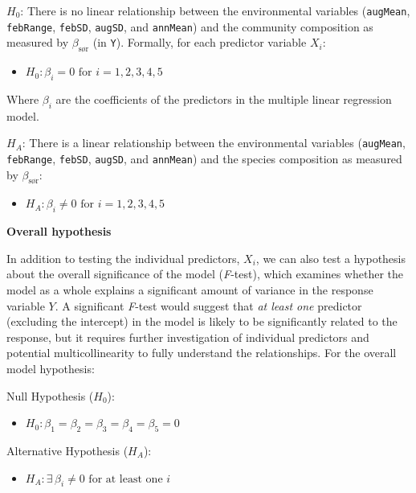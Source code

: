 \documentclass[
  letterpaper,
]{book}
\providecommand{\tightlist}{%
  \setlength{\itemsep}{0pt}\setlength{\parskip}{0pt}}\usepackage{longtable,booktabs,array}
\begin{document}
\(H_0\): There is no linear relationship between the environmental
variables (\texttt{augMean}, \texttt{febRange}, \texttt{febSD},
\texttt{augSD}, and \texttt{annMean}) and the community composition as
measured by \(\beta_\text{sør}\) (in \texttt{Y}). Formally, for each
predictor variable \(X_i\):

\begin{itemize}
\tightlist
\item
  \(H_0: \beta_i = 0 \text{ for } i = 1, 2, 3, 4, 5\)
\end{itemize}

Where \(\beta_i\) are the coefficients of the predictors in the multiple
linear regression model.

\(H_A\): There is a linear relationship between the environmental
variables (\texttt{augMean}, \texttt{febRange}, \texttt{febSD},
\texttt{augSD}, and \texttt{annMean}) and the species composition as
measured by \(\beta_\text{sør}\):

\begin{itemize}
\tightlist
\item
  \(H_A: \beta_i \neq 0 \text{ for } i = 1, 2, 3, 4, 5\)
\end{itemize}

\textbf{Overall hypothesis}

In addition to testing the individual predictors, \(X_i\), we can also
test a hypothesis about the overall significance of the model
(\emph{F}-test), which examines whether the model as a whole explains a
significant amount of variance in the response variable \(Y\). A
significant \emph{F}-test would suggest that \emph{at least one}
predictor (excluding the intercept) in the model is likely to be
significantly related to the response, but it requires further
investigation of individual predictors and potential multicollinearity
to fully understand the relationships. For the overall model hypothesis:

Null Hypothesis (\(H_0\)):

\begin{itemize}
\tightlist
\item
  \(H_0: \beta_1 = \beta_2 = \beta_3 = \beta_4 = \beta_5 = 0\)
\end{itemize}

Alternative Hypothesis (\(H_A\)):

\begin{itemize}
\tightlist
\item
  \(H_A: \exists \, \beta_i \neq 0 \text{ for at least one } i\)
\end{itemize}
\end{document}

